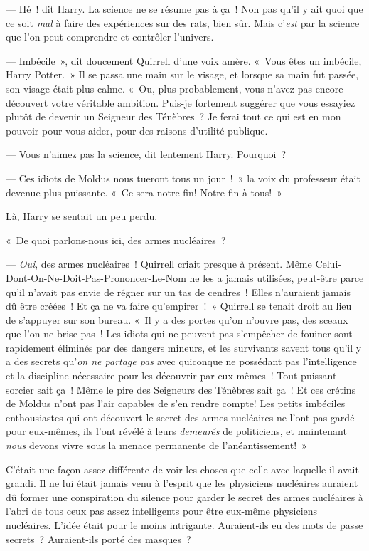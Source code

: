 --- Hé~! dit Harry.
La science ne se résume pas à ça~!
Non pas qu'il y ait quoi que ce soit \emph{mal} à faire des expériences sur des rats, bien sûr.
Mais c'\emph{est} par la science que l'on peut comprendre et contrôler l'univers.

--- Imbécile~», dit doucement Quirrell d'une voix amère.
«~Vous êtes un imbécile, Harry Potter.~»
Il se passa une main sur le visage, et lorsque sa main fut passée, son visage était plus calme.
«~Ou, plus probablement, vous n'avez pas encore découvert votre véritable ambition.
Puis-je fortement suggérer que vous essayiez plutôt de devenir un Seigneur des Ténèbres~?
Je ferai tout ce qui est en mon pouvoir pour vous aider, pour des raisons d'utilité publique.

--- Vous n'aimez pas la science, dit lentement Harry.
Pourquoi~?

--- Ces idiots de Moldus nous tueront tous un jour~!~»
la voix du professeur était devenue plus puissante.
«~Ce sera notre fin! Notre fin à tous!~»

Là, Harry se sentait un peu perdu.

«~De quoi parlons-nous ici, des armes nucléaires~?

--- \emph{Oui}, des armes nucléaires~! Quirrell criait presque à présent.
Même Celui-Dont-On-Ne-Doit-Pas-Prononcer-Le-Nom ne les a jamais utilisées, peut-être parce qu'il n'avait pas envie de régner sur un tas de cendres~!
Elles n'auraient jamais dû être créées~!
Et ça ne va faire qu'empirer~!~»
Quirrell se tenait droit au lieu de s'appuyer sur son bureau.
«~Il y a des portes qu'on n'ouvre pas, des sceaux que l'on ne brise pas~!
Les idiots qui ne peuvent pas s'empêcher de fouiner sont rapidement éliminés par des dangers mineurs, et les survivants savent tous qu'il y a des secrets qu'\emph{on ne partage pas} avec quiconque ne possédant pas l'intelligence et la discipline nécessaire pour les découvrir par eux-mêmes~!
Tout puissant sorcier sait ça~!
Même le pire des Seigneurs des Ténèbres sait ça~!
Et ces crétins de Moldus n'ont pas l'air capables de s'en rendre compte!
Les petits imbéciles enthousiastes qui ont découvert le secret des armes nucléaires ne l'ont pas gardé pour eux-mêmes, ils l'ont révélé à leurs \emph{demeurés} de politiciens, et maintenant \emph{nous} devons vivre sous la menace permanente de l'anéantissement!~»

C'était une façon assez différente de voir les choses que celle avec laquelle il avait grandi.
Il ne lui était jamais venu à l'esprit que les physiciens nucléaires auraient dû former une conspiration du silence pour garder le secret des armes nucléaires à l'abri de tous ceux pas assez intelligents pour être eux-même physiciens nucléaires.
L'idée était pour le moins intrigante.
Auraient-ils eu des mots de passe secrets~?
Auraient-ils porté des masques~?

